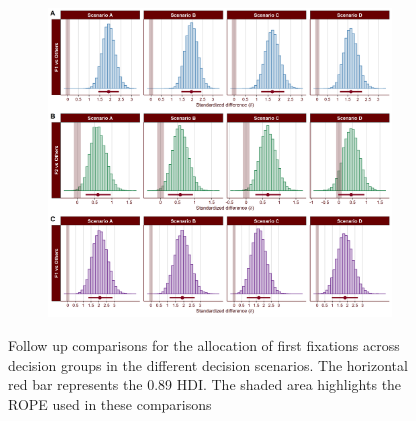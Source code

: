 \documentclass[
  english,
  man]{apa6}
\begin{document}
\begin{appendix}
\begin{figure}[!b]
\centering
\begin{subfigure}{1\textwidth}
\includegraphics[width=\linewidth]{Figures/SC2_first_scenario_comparisons_A.png}
\label{fig:first-scenario-comparisons-A}
\end{subfigure}
\caption[]{Follow up comparisons for the allocation of first fixations across decision groups in the different decision scenarios. The horizontal red bar represents the 0.89 HDI. The shaded area highlights the ROPE used in these comparisons}
\end{figure}

\medskip


\end{appendix}
\end{document}
